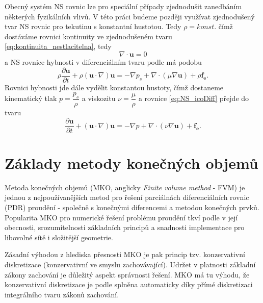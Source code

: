 Obecný systém NS rovnic lze pro speciální případy zjednodušit zanedbáním některých fyzikálních vlivů. 
V této práci budeme později využívat zjednodušený tvar NS rovnic pro tekutinu s konstantní hustotou. 
Tedy $\rho=konst.$ čímž dostáváme rovnici kontinuity ve zjednodušeném tvaru \ref{eq:kontinuita_nestlacitelna}, tedy
\begin{equation}\label{eq:NS_icoKontinuita}
\nabla\cdot\mathbf{u} = 0
\end{equation}
a NS rovnice hybnosti v diferenciálním tvaru podle \cite{hirsch2007numerical} má podobu 
\begin{equation}\label{eq:NS_icoDiff}
\rho \dfrac{\partial \mathbf{u}}{\partial t}+ \rho(\mathbf{u}\cdot \nabla)\mathbf{u} = -\nabla p_s + \nabla \cdot (\mu \nabla \mathbf{u}) + \rho \mathbf{f_e}.
\end{equation}
Rovnici hybnosti jde dále vydělit konstantou hustoty, čímž dostaneme kinematický tlak $ p = \dfrac{p_s}{\rho} $ a viskozitu $ \nu=\dfrac{\mu}{\rho} $ a rovnice \ref{eq:NS_icoDiff} přejde do tvaru
\begin{equation}\label{eq:NS_icoPseudotlak}
\dfrac{\partial \mathbf{u}}{\partial t}+ (\mathbf{u}\cdot \nabla)\mathbf{u} = -\nabla p + \nabla \cdot (\nu \nabla \mathbf{u}) + \mathbf{f_e}.
\end{equation}



\section{Základy metody konečných objemů}

Metoda konečných objemů (MKO, anglicky \textit{Finite volume method} - FVM) je jednou z nejpoužívanějších metod pro řešení parciálnách diferenciálních rovnic (PDR) proudění - společně s konečnými diferencemi a metodou konečných prvků. 
Popularita MKO pro numerické řešení problému proudění tkví podle \cite{hirsch2007numerical} v její obecnosti, srozumitelnosti základních principů a snadnosti implementace pro libovolné sítě i složitější geometrie.

Zásadní výhodou z hlediska přesnosti MKO je pak princip tzv. konzervativní diskretizace (konzervativní ve smyslu zachovávající). Udržet v platnosti základní zákony zachování je důležitý aspekt správnosti řešení. MKO má tu výhodu, že konzervativní diskretizace je podle \cite{hirsch2007numerical} splněna automaticky díky přímé diskretizaci integrálního tvaru zákonů zachování. 

